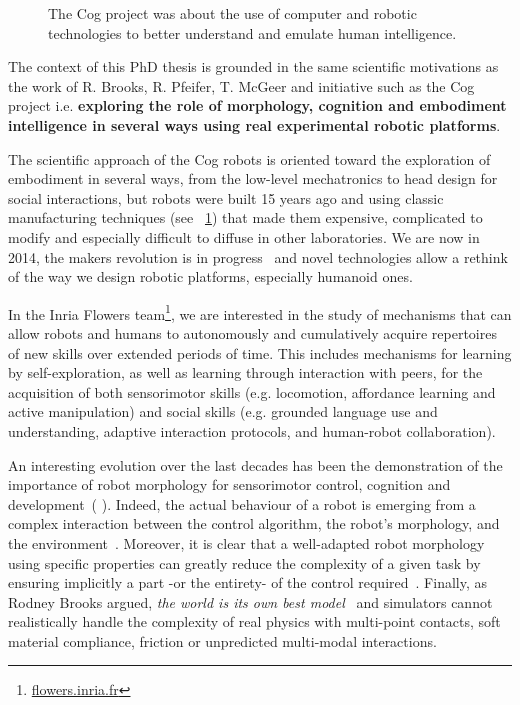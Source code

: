 \begin{figure}[tb]
\centering
    \hfill
    \caption{The Cog project was about the use of computer and robotic technologies to better understand and emulate human intelligence.}
    \label{fig:cog_project}
\end{figure}


The context of this PhD thesis is grounded in the same scientific motivations as the work of R. Brooks, R. Pfeifer, T. McGeer and initiative such as the Cog project i.e. \textbf{exploring the role of morphology, cognition and embodiment intelligence in several ways using real experimental robotic platforms}.

The scientific approach of the Cog robots is oriented toward the exploration of embodiment in several ways, from the low-level mechatronics to head design for social interactions, but robots were built 15 years ago and using classic manufacturing techniques (see \figurename~\ref{fig:cog_project}) that made them expensive, complicated to modify and especially difficult to diffuse in other laboratories.
We are now in 2014, the makers revolution is in progress~\parencite{anderson2012makers} and novel technologies allow a rethink of the way we design robotic platforms, especially humanoid ones.


In the Inria Flowers team\footnote{\url{flowers.inria.fr}}, we are interested in the study of mechanisms that can allow robots and humans to autonomously and cumulatively acquire repertoires of new skills over extended periods of time. This includes mechanisms for learning by self-exploration, as well as learning through interaction with peers, for the acquisition of both sensorimotor skills (e.g. locomotion, affordance learning and active manipulation) and social skills (e.g. grounded language use and understanding, adaptive interaction protocols, and human-robot collaboration).

An interesting evolution over the last decades has been the demonstration of the importance of robot morphology for sensorimotor control, cognition and development~(\cite{kaplan2008corps} \cite{steels1995artificial} \cite{Pfeifer06}). Indeed, the actual behaviour of a robot is emerging from a complex interaction between the control algorithm, the robot’s morphology, and the environment~\parencite{Steels1991emergence}. Moreover, it is clear that a well-adapted robot morphology using specific properties can greatly reduce the complexity of a given task by ensuring implicitly a part -or the entirety- of the control required~\parencite{pfeifer2005morphological}.
Finally, as Rodney Brooks argued, \emph{the world is its own best model}~\parencite{brooks1991intelligence} and simulators cannot realistically handle the complexity of real physics with multi-point contacts, soft material compliance, friction or unpredicted multi-modal interactions.



